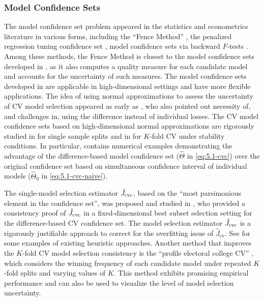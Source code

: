 \documentclass[11pt]{article}
\theoremstyle{plain}
\newcommand{\cv}{{\mathrm{cv}}}
\begin{document}
\subsubsection{Model Confidence Sets}
The model confidence set problem appeared in the statistics and econometrics literature in various forms, including the ``Fence Method'' \citep{jiang2008fence}, the penalized regression tuning confidence set \citep{gunes2012confidence}, model confidence sets via backward $F$-tests \citep{hansen2011model,ferrari2015confidence}.
Among these methods, the Fence Method is closest to the model confidence sets developed in , as it also computes a quality measure for each candidate model and accounts for the uncertainty of such measures.  The model confidence sets developed in   are applicable in high-dimensional settings and have more flexible applications. 
The idea of using normal approximations to assess the uncertainty of CV model selection appeared as early as \cite{yang2006comparing}, who also pointed out necessity of, and challenges in, using the difference instead of individual losses.
The CV model confidence sets based on high-dimensional normal approximations are rigorously studied in \cite{lei2020cross} for single sample splits and in \cite{kissel2022high} for $K$-fold CV under stability conditions.  In particular, \cite{kissel2022high} contains numerical examples demonstrating the advantage of the difference-based model confidence set ($\hat\Theta$ in \eqref{eq:5.1-cvc}) over  the original confidence set based on simultaneous confidence interval of individual models ($\hat\Theta_0$ in \eqref{eq:5.1-cvc-naive}).

The single-model selection estimator $\hat J_{\rm cvc}$, based on the ``most parsimonious element in the confidence set'', was proposed and studied in \cite{lei2020cross}, who provided a consistency proof of $\hat J_{\rm cvc}$ in a fixed-dimensional best subset selection setting for the difference-based CV confidence set.
The model selection estimator $\hat J_{\rm cvc}$ is a rigorously justifiable approach to correct for the overfitting issue of $\hat J_{\cv}$.  See \cite{efron1997improvements,tibshirani2009bias,lim2016estimation} for some examples of existing heuristic approaches.  Another method that improves the $K$-fold CV model selection consistency is the ``profile electoral college CV'' \citep[PEC-CV,][]{zhan2022profile}, which considers the winning frequency of each candidate model under repeated $K$-fold splits and varying values of $K$.  This method exhibits promising empirical performance and can also be used to visualize the level of model selection uncertainty.
\end{document}

